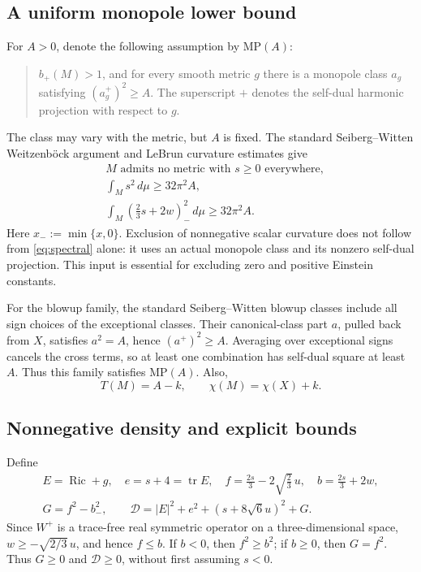 \documentclass[a4paper,11pt]{article}
\theoremstyle{paper}
\DeclareMathOperator{\Ric}{Ric}
\DeclareMathOperator{\tr}{tr}
\newcommand{\dd}{\,d\mu}
\newcommand{\Dcal}{\mathcal D}
\numberwithin{equation}{section}
\begin{document}
\subsection{A uniform monopole lower bound}

For $A>0$, denote the following assumption by $\mathrm{MP}(A)$:
\begin{quote}
$b_+(M)>1$, and for every smooth metric $g$ there is a monopole class $a_g$ satisfying $(a_g^+)^2\ge A$. The superscript $+$ denotes the self-dual harmonic projection with respect to $g$.
\end{quote}
The class may vary with the metric, but $A$ is fixed. The standard Seiberg--Witten Weitzenb\"ock argument and LeBrun curvature estimates give \cite{lebrun2001,lebrun2004}
\begin{align}
&M\text{ admits no metric with }s\ge0\text{ everywhere},\label{eq:no-psc}\\
&\int_Ms^2\dd\ge32\pi^2A,\label{eq:scalar}\\
&\int_M\left(\frac23s+2w\right)_{-}^{\!2}\dd\ge32\pi^2A.\label{eq:spectral}
\end{align}
Here $x_-:=\min\{x,0\}$. Exclusion of nonnegative scalar curvature does not follow from \eqref{eq:spectral} alone: it uses an actual monopole class and its nonzero self-dual projection. This input is essential for excluding zero and positive Einstein constants.

For the blowup family, the standard Seiberg--Witten blowup classes include all sign choices of the exceptional classes. Their canonical-class part $a$, pulled back from $X$, satisfies $a^2=A$, hence $(a^+)^2\ge A$. Averaging over exceptional signs cancels the cross terms, so at least one combination has self-dual square at least $A$. Thus this family satisfies $\mathrm{MP}(A)$. Also,
\begin{equation}\label{eq:blow-top}
T(M)=A-k,\qquad \chi(M)=\chi(X)+k.
\end{equation}

\subsection{Nonnegative density and explicit bounds}

Define
\begin{gather}
E=\Ric+g,\quad e=s+4=\tr E,\quad
f=\frac{2s}{3}-2\sqrt{\frac23}\,u,\quad b=\frac{2s}{3}+2w,\label{eq:defs}\\
G=f^2-b_-^2,\qquad
\Dcal=|E|^2+e^2+(s+8\sqrt6u)^2+G.\label{eq:density}
\end{gather}
Since $W^+$ is a trace-free real symmetric operator on a three-dimensional space, $w\ge-\sqrt{2/3}\,u$, and hence $f\le b$. If $b<0$, then $f^2\ge b^2$; if $b\ge0$, then $G=f^2$. Thus $G\ge0$ and $\Dcal\ge0$, without first assuming $s<0$.
\end{document}
